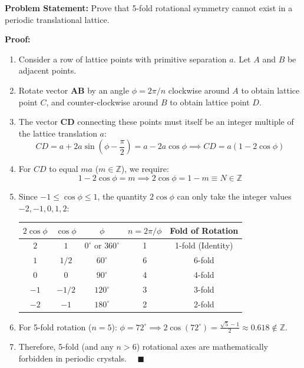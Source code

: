 \documentclass[11pt,a4paper]{article}
\begin{document}
\begin{solbox}
\textbf{Problem Statement:} Prove that 5-fold rotational symmetry cannot exist in a periodic translational lattice.

\textbf{Proof:}
\begin{enumerate}
    \item Consider a row of lattice points with primitive separation $a$. Let $A$ and $B$ be adjacent points.
    \item Rotate vector $\mathbf{AB}$ by an angle $\phi = 2\pi/n$ clockwise around $A$ to obtain lattice point $C$, and counter-clockwise around $B$ to obtain lattice point $D$.
    \item The vector $\mathbf{CD}$ connecting these points must itself be an integer multiple of the lattice translation $a$:
    \begin{equation}
    CD = a + 2a\sin\left(\phi - \frac{\pi}{2}\right) = a - 2a\cos\phi \implies CD = a(1 - 2\cos\phi)
    \end{equation}
    \item For $CD$ to equal $m a$ ($m \in \mathbb{Z}$), we require:
    \begin{equation}
    1 - 2\cos\phi = m \implies 2\cos\phi = 1 - m \equiv N \in \mathbb{Z}
    \end{equation}
    \item Since $-1 \le \cos\phi \le 1$, the quantity $2\cos\phi$ can only take the integer values $-2, -1, 0, 1, 2$:
    \begin{center}
    \begin{tabular}{ccccc}
    \toprule
    $2\cos\phi$ & $\cos\phi$ & $\phi$ & $n = 2\pi/\phi$ & \textbf{Fold of Rotation} \\
    \midrule
    $2$ & $1$ & $0^\circ \text{ or } 360^\circ$ & 1 & 1-fold (Identity) \\
    $1$ & $1/2$ & $60^\circ$ & 6 & 6-fold \\
    $0$ & $0$ & $90^\circ$ & 4 & 4-fold \\
    $-1$ & $-1/2$ & $120^\circ$ & 3 & 3-fold \\
    $-2$ & $-1$ & $180^\circ$ & 2 & 2-fold \\
    \bottomrule
    \end{tabular}
    \end{center}
    \item For 5-fold rotation ($n=5$): $\phi = 72^\circ \implies 2\cos(72^\circ) = \frac{\sqrt{5}-1}{2} \approx 0.618 \notin \mathbb{Z}$.
    \item Therefore, 5-fold (and any $n > 6$) rotational axes are mathematically forbidden in periodic crystals. $\quad\blacksquare$
\end{enumerate}
\end{solbox}
\end{document}

